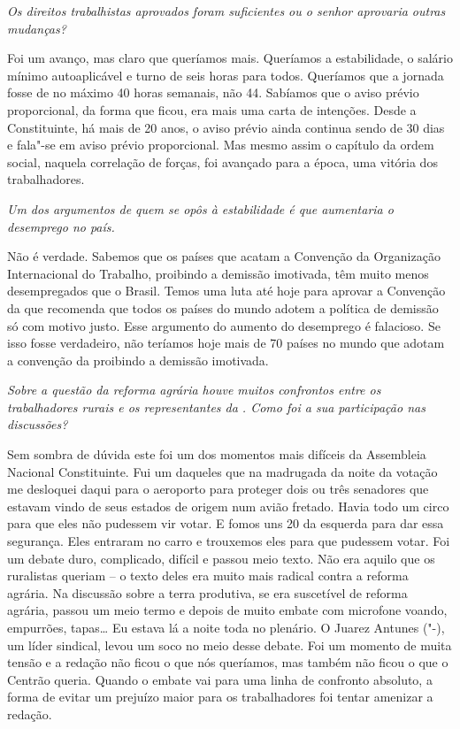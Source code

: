 \medskip

\noindent\emph{Os direitos trabalhistas aprovados foram suficientes ou o senhor
aprovaria outras mudanças?}

Foi um avanço, mas claro que queríamos mais. Queríamos a
estabilidade, o salário mínimo autoaplicável e turno de seis horas para
todos. Queríamos que a jornada fosse de no máximo 40 horas semanais, não
44. Sabíamos que o aviso prévio proporcional, da forma que ficou, era
mais uma carta de intenções. Desde a Constituinte, há mais de 20 anos, o
aviso prévio ainda continua sendo de 30 dias e fala"-se em aviso prévio
proporcional. Mas mesmo assim o capítulo da ordem social, naquela
correlação de forças, foi avançado para a época, uma vitória dos
trabalhadores.

\medskip

\noindent\emph{Um dos argumentos de quem se opôs à estabilidade é que
aumentaria o desemprego no país.}

Não é verdade. Sabemos que os países que acatam a
Convenção da Organização Internacional do Trabalho, proibindo a demissão
imotivada, têm muito menos desempregados que o Brasil. Temos uma luta
até hoje para aprovar a Convenção da  que recomenda que todos os
países do mundo adotem a política de demissão só com motivo justo. Esse
argumento do aumento do desemprego é falacioso. Se isso fosse
verdadeiro, não teríamos hoje mais de 70 países no mundo que adotam a
convenção da  proibindo a demissão imotivada.

\medskip

\noindent\emph{Sobre a questão da reforma agrária houve muitos confrontos entre
os trabalhadores rurais e os representantes da . Como foi a sua
participação nas discussões?}

Sem sombra de dúvida este foi um dos momentos mais
difíceis da Assembleia Nacional Constituinte. Fui um daqueles que na
madrugada da noite da votação me desloquei daqui para o aeroporto para
proteger dois ou três senadores que estavam vindo de seus estados de
origem num avião fretado. Havia todo um circo para que eles não pudessem
vir votar. E fomos uns 20 da esquerda para dar essa segurança. Eles
entraram no carro e trouxemos eles para que pudessem votar. Foi um
debate duro, complicado, difícil e passou meio texto. Não era aquilo que
os ruralistas queriam -- o texto deles era muito mais radical contra a
reforma agrária. Na discussão sobre a terra produtiva, se era suscetível
de reforma agrária, passou um meio termo e depois de muito embate com
microfone voando, empurrões, tapas\ldots{} Eu estava lá a noite toda no
plenário. O Juarez Antunes ("-), um líder sindical, levou um soco no
meio desse debate. Foi um momento de muita tensão e a redação não ficou
o que nós queríamos, mas também não ficou o que o Centrão queria. Quando
o embate vai para uma linha de confronto absoluto, a forma de evitar um
prejuízo maior para os trabalhadores foi tentar amenizar a redação.

